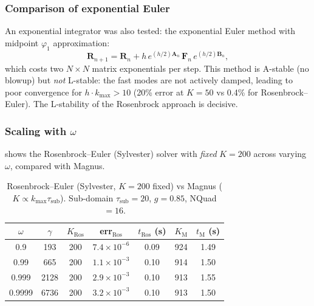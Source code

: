 \documentclass[11pt,a4paper]{article}
\newcommand{\mat}[1]{\mathbf{#1}}
\newcommand{\tsub}{\tau_{\mathrm{sub}}}
\newcommand{\kmax}{k_{\max}}
\theoremstyle{definition}
\begin{document}
\subsubsection{Comparison of exponential Euler}

An exponential integrator was also tested: the exponential Euler
method with midpoint $\varphi_1$ approximation:
\begin{equation}
  \mat{R}_{n+1} = \mat{R}_n
  + h\,e^{(h/2)\mat{A}_n}\,\mat{F}_n\,e^{(h/2)\mat{B}_n},
\end{equation}
which costs two $N\!\times\!N$ matrix exponentials per step.
This method is A-stable (no blowup) but \emph{not} L-stable:
the fast modes are not actively damped, leading to poor convergence
for $h\cdot\kmax > 10$ (20\% error at $K=50$ vs 0.4\% for
Rosenbrock--Euler).  The L-stability of the Rosenbrock approach is
decisive.

\subsubsection{Scaling with $\omega$}

 shows the Rosenbrock--Euler (Sylvester)
solver with \emph{fixed} $K=200$ across varying $\omega$, compared
with Magnus.

\begin{table}[h]\centering
\caption{Rosenbrock--Euler (Sylvester, $K=200$ fixed) vs Magnus
($K\propto\kmax\tsub$).  Sub-domain $\tsub=20$, $g=0.85$,
NQuad${}=16$.}\label{tab:sylvester_omega}
\begin{tabular}{ccccccc}
\toprule
$\omega$ & $\gamma$ & $K_{\text{Ros}}$ & err$_{\text{Ros}}$
& $t_{\text{Ros}}$ (s) & $K_{\text{M}}$ & $t_{\text{M}}$ (s) \\
\midrule
0.9    &   193 & 200 & $7.4\times 10^{-6}$ & 0.09 & 924 & 1.49 \\
0.99   &   665 & 200 & $1.1\times 10^{-3}$ & 0.10 & 914 & 1.50 \\
0.999  &  2128 & 200 & $2.9\times 10^{-3}$ & 0.10 & 913 & 1.55 \\
0.9999 &  6736 & 200 & $3.2\times 10^{-3}$ & 0.10 & 913 & 1.50 \\
\bottomrule
\end{tabular}
\end{table}
\end{document}

